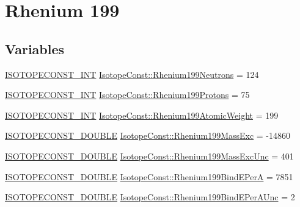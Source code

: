 \hypertarget{group___isotope_const-_rhenium-_re199}{}\section{Rhenium 199}
\label{group___isotope_const-_rhenium-_re199}
\subsection*{Variables}
\begin{DoxyCompactItemize}
\item 
\mbox{\hyperlink{group___isotope_const-_macros_ga5f18360b3e99483a35c32d789e62621c}{I\+S\+O\+T\+O\+P\+E\+C\+O\+N\+S\+T\+\_\+\+I\+NT}} \mbox{\hyperlink{group___isotope_const-_rhenium-_re199_ga87d3d3ea51a0b1069cb4934f1815cf52}{Isotope\+Const\+::\+Rhenium199\+Neutrons}} = 124
\item 
\mbox{\hyperlink{group___isotope_const-_macros_ga5f18360b3e99483a35c32d789e62621c}{I\+S\+O\+T\+O\+P\+E\+C\+O\+N\+S\+T\+\_\+\+I\+NT}} \mbox{\hyperlink{group___isotope_const-_rhenium-_re199_ga8eb2dc9d3e8025fd07efe01846c852b1}{Isotope\+Const\+::\+Rhenium199\+Protons}} = 75
\item 
\mbox{\hyperlink{group___isotope_const-_macros_ga5f18360b3e99483a35c32d789e62621c}{I\+S\+O\+T\+O\+P\+E\+C\+O\+N\+S\+T\+\_\+\+I\+NT}} \mbox{\hyperlink{group___isotope_const-_rhenium-_re199_ga009fedd36a263398a9fac371d37bfb89}{Isotope\+Const\+::\+Rhenium199\+Atomic\+Weight}} = 199
\item 
\mbox{\hyperlink{group___isotope_const-_macros_ga8f45a7272ce02c0b4c65c44636ed719a}{I\+S\+O\+T\+O\+P\+E\+C\+O\+N\+S\+T\+\_\+\+D\+O\+U\+B\+LE}} \mbox{\hyperlink{group___isotope_const-_rhenium-_re199_ga520b9fd62b003c9832c00215850d2d0b}{Isotope\+Const\+::\+Rhenium199\+Mass\+Exc}} = -\/14860
\item 
\mbox{\hyperlink{group___isotope_const-_macros_ga8f45a7272ce02c0b4c65c44636ed719a}{I\+S\+O\+T\+O\+P\+E\+C\+O\+N\+S\+T\+\_\+\+D\+O\+U\+B\+LE}} \mbox{\hyperlink{group___isotope_const-_rhenium-_re199_ga8f06d92fcb262742fb96182c7e42f4b8}{Isotope\+Const\+::\+Rhenium199\+Mass\+Exc\+Unc}} = 401
\item 
\mbox{\hyperlink{group___isotope_const-_macros_ga8f45a7272ce02c0b4c65c44636ed719a}{I\+S\+O\+T\+O\+P\+E\+C\+O\+N\+S\+T\+\_\+\+D\+O\+U\+B\+LE}} \mbox{\hyperlink{group___isotope_const-_rhenium-_re199_gac7bc9b46e5c13b3f7309847246d203bf}{Isotope\+Const\+::\+Rhenium199\+Bind\+E\+PerA}} = 7851
\item 
\mbox{\hyperlink{group___isotope_const-_macros_ga8f45a7272ce02c0b4c65c44636ed719a}{I\+S\+O\+T\+O\+P\+E\+C\+O\+N\+S\+T\+\_\+\+D\+O\+U\+B\+LE}} \mbox{\hyperlink{group___isotope_const-_rhenium-_re199_ga7b94ebfc50455f7245562d9037c22669}{Isotope\+Const\+::\+Rhenium199\+Bind\+E\+Per\+A\+Unc}} = 2

\end{DoxyCompactItemize}
